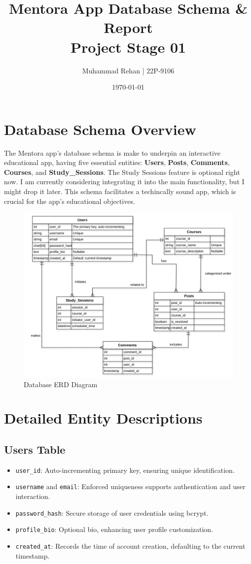 \documentclass[12pt]{article} %
\title{Mentora App Database Schema \& Report\\ Project Stage 01}
\author{Muhammad Rehan | 22P-9106}
\date{\today}
\begin{document}
\maketitle
\section*{Database Schema Overview}
The Mentora app's database schema is make to underpin an interactive educational app, having five essential entities: \textbf{Users}, \textbf{Posts}, \textbf{Comments}, \textbf{Courses}, and \textbf{Study\_Sessions}. The Study Sessions feature is optional right now. I am currently considering integrating it into the main functionality, but I might drop it later. This schema facilitates a techincally sound app, which is crucial for the app's educational objectives.

\begin{figure}[ht]
  \centering
  \includegraphics[width=\linewidth]{1.pdf}
  \caption{Database ERD Diagram}
  \label{fig:ust}
  \end{figure}

\section*{Detailed Entity Descriptions}

\subsection*{Users Table}
\begin{itemize}
    \item \texttt{user\_id}: Auto-incrementing primary key, ensuring unique identification.
    \item \texttt{username} and \texttt{email}: Enforced uniqueness supports authentication and user interaction.
    \item \texttt{password\_hash}: Secure storage of user credentials using bcrypt.
    \item \texttt{profile\_bio}: Optional bio, enhancing user profile customization.
    \item \texttt{created\_at}: Records the time of account creation, defaulting to the current timestamp.
\end{itemize}
\end{document}
